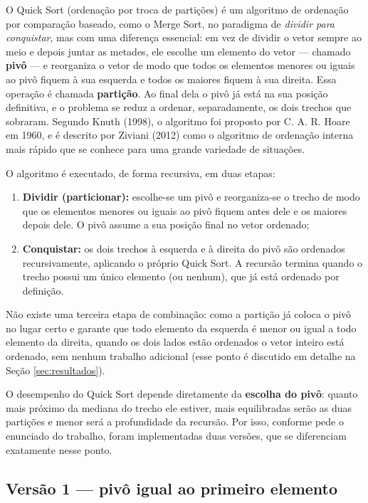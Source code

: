 \qquad O Quick Sort (ordenação por troca de partições) é um algoritmo de
ordenação por comparação baseado, como o Merge Sort, no paradigma de
\textit{dividir para conquistar}, mas com uma diferença essencial: em
vez de dividir o vetor sempre ao meio e depois juntar as metades, ele
escolhe um elemento do vetor --- chamado \textbf{pivô} --- e
reorganiza o vetor de modo que todos os elementos menores ou iguais ao
pivô fiquem à sua esquerda e todos os maiores fiquem à sua direita.
Essa operação é chamada \textbf{partição}. Ao final dela o pivô já
está na sua posição definitiva, e o problema se reduz a ordenar,
separadamente, os dois trechos que sobraram. Segundo Knuth (1998), o
algoritmo foi proposto por C. A. R. Hoare em 1960, e é descrito por
Ziviani (2012) como o algoritmo de ordenação interna mais rápido que se
conhece para uma grande variedade de situações.

\qquad O algoritmo é executado, de forma recursiva, em duas etapas:

\begin{enumerate}
    \item \textbf{Dividir (particionar):} escolhe-se um pivô e
    reorganiza-se o trecho de modo que os elementos menores ou iguais
    ao pivô fiquem antes dele e os maiores depois dele. O pivô assume
    a sua posição final no vetor ordenado;
    \item \textbf{Conquistar:} os dois trechos à esquerda e à direita
    do pivô são ordenados recursivamente, aplicando o próprio Quick
    Sort. A recursão termina quando o trecho possui um único elemento
    (ou nenhum), que já está ordenado por definição.
\end{enumerate}

\qquad Não existe uma terceira etapa de combinação: como a partição já
coloca o pivô no lugar certo e garante que todo elemento da esquerda é
menor ou igual a todo elemento da direita, quando os dois lados estão
ordenados o vetor inteiro está ordenado, sem nenhum trabalho adicional
(esse ponto é discutido em detalhe na Seção \ref{sec:resultados}).

\qquad O desempenho do Quick Sort depende diretamente da
\textbf{escolha do pivô}: quanto mais próximo da mediana do trecho ele
estiver, mais equilibradas serão as duas partições e menor será a
profundidade da recursão. Por isso, conforme pede o enunciado do
trabalho, foram implementadas duas versões, que se diferenciam
exatamente nesse ponto.

\subsection{Versão 1 --- pivô igual ao primeiro elemento}

